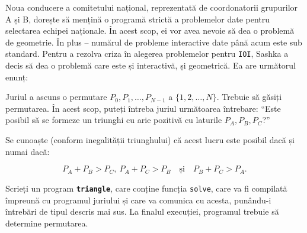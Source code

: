 \documentclass[12pt]{article}
\begin{document}
\renewcommand{\headerLang}{Română}
\renewcommand{\problemName}{AB23. TRIANGLE}

\renewcommand{\headerLeft}{IATI Day 2, Senior group}
\renewcommand{\headerRightFirst}{XVII INTERNATIONAL ADVANCED TOURNAMENT IN INFORMATICS}
\renewcommand{\headerRightSecond}{ONLINE 2026}

\renewcommand{\tl}{$10$ sec.}
\renewcommand{\ml}{$1024$ MB}
\problem{Problema \problemName}

Noua conducere a comitetului național, reprezentată de coordonatorii grupurilor A și B, dorește să mențină o programă strictă a problemelor date pentru selectarea echipei naționale. În acest scop, ei vor avea nevoie să dea o problemă de geometrie. În plus -- numărul de probleme interactive date până acum este sub standard. Pentru a rezolva criza în alegerea problemelor pentru \texttt{IOI}, Sashka a decis să dea o problemă care este și interactivă, și geometrică. Ea are următorul enunț:

Juriul a ascuns o permutare $P_0,P_1,\dots,P_{N-1}$ a $\{1,2,\dots,N\}$. Trebuie să găsiți permutarea. În acest scop, puteți întreba juriul următoarea întrebare: ``Este posibil să se formeze un triunghi cu arie pozitivă cu laturile $P_A,P_B,P_C$?''

Se cunoaște (conform inegalității triunghului) că acest lucru este posibil dacă și numai dacă:

\[P_A + P_B > P_C,\ P_A + P_C > P_B \quad \text{și} \quad P_B + P_C > P_A.\]

Scrieți un program \textbf{\texttt{triangle}}, care conține funcția \texttt{solve}, care va fi compilată împreună cu programul juriului și care va comunica cu acesta, punându-i întrebări de tipul descris mai sus. La finalul execuției, programul trebuie să determine permutarea.
\end{document}
